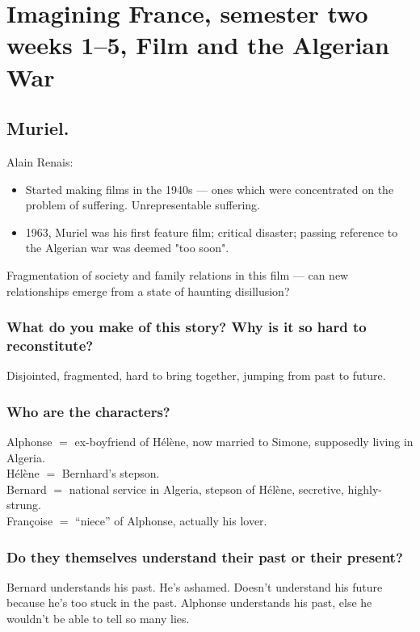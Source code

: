 \documentclass[12pt]{article}
\begin{document}
\section*{Imagining France, semester two weeks 1--5, Film and the
Algerian War}

\subsection*{Muriel.}

Alain Renais:
\begin{itemize}
  \item{Started making films in the 1940s --- ones which were concentrated
        on the problem of suffering. Unrepresentable suffering.}
  \item{1963, Muriel was his first feature film; critical disaster;
        passing reference to the Algerian war was deemed "too soon".}
\end{itemize}

Fragmentation of society and family relations in this film --- can new
relationships emerge from a state of haunting disillusion?

\subsubsection*{What do you make of this story? Why is it so hard to
reconstitute?}

Disjointed, fragmented, hard to bring together, jumping from past to
future.

\subsubsection*{Who are the characters?}

Alphonse $=$ ex-boyfriend of Hélène, now married to Simone, supposedly
living in Algeria.\\
Hélène $=$ Bernhard's stepson.\\
Bernard $=$ national service in Algeria, stepson of Hélène, secretive,
highly-strung.\\
Françoise $=$ ``niece'' of Alphonse, actually his lover.

\subsubsection*{Do they themselves understand their past or their present?}

Bernard understands his past. He's ashamed. Doesn't understand his
future because he's too stuck in the past. Alphonse understands his
past, else he wouldn't be able to tell so many lies.
\end{document}
